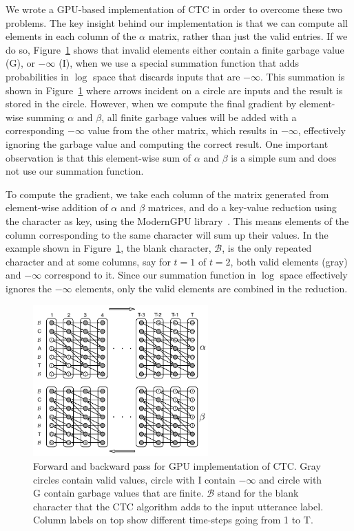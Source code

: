 \documentclass{article}
\begin{document}
We wrote a GPU-based implementation of CTC in order to overcome these two problems. The key insight behind our implementation is that we can compute all elements in each column of the $\alpha$ matrix, rather than just the valid entries. If we do so, Figure~\ref{fig:gpuctc-forward-backward} shows that invalid elements either contain a finite garbage value (\textsf{G}), or $-\infty$ (\textsf{I}), when we use a special summation function that adds probabilities in $\log$ space that discards inputs that are $-\infty$. This summation is shown in Figure~\ref{fig:gpuctc-forward-backward} where arrows incident on a circle are inputs and the result is stored in the circle. However, when we compute the final gradient by element-wise summing $\alpha$ and $\beta$, all finite garbage values will be added with a corresponding $-\infty$ value from the other matrix, which results in $-\infty$, effectively ignoring the garbage value and computing the correct result. One important observation is that this element-wise sum of $\alpha$ and $\beta$ is a simple sum and does not use our summation function.

To compute the gradient, we take each column of the matrix generated from element-wise addition of $\alpha$ and $\beta$ matrices, and do a key-value reduction using the character as key, using the ModernGPU library~\cite{ModernGPU}. This means elements of the column corresponding to the same character will sum up their values. In the example shown in Figure~\ref{fig:gpuctc-forward-backward}, the blank character, $\mathcal{B}$, is the only repeated character and at some columns, say for $t=1$ of $t=2$, both valid elements (gray) and $-\infty$ correspond to it. Since our summation function in $\log$ space effectively ignores the $-\infty$ elements, only the valid elements are combined in the reduction. 


\begin{figure}[h]
    \centering
    \includegraphics[width=0.6\textwidth]{GPUCTC_forward_backward.pdf}
    \caption{Forward and backward pass for GPU implementation of CTC. Gray circles contain valid values, circle with \textsf{I} contain $-\infty$ and circle with \textsf{G} contain garbage values that are finite. $\mathcal{B}$ stand for the blank character that the CTC algorithm adds to the input utterance label. Column labels on top show different time-steps going from \textsf{1} to \textsf{T}. 
    }
    \label{fig:gpuctc-forward-backward}
\end{figure}
\end{document}
